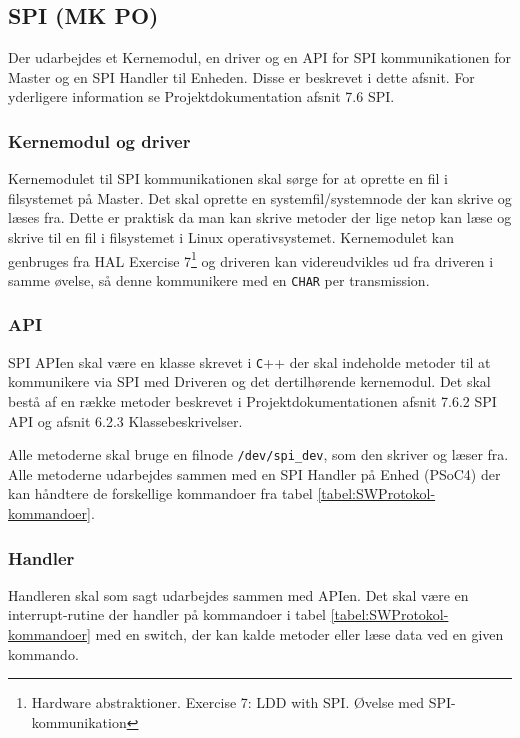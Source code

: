 \subsection{SPI (MK PO)}

Der udarbejdes et Kernemodul, en driver og en API for SPI kommunikationen for Master og en SPI Handler til Enheden. Disse er beskrevet i dette afsnit. For yderligere information se Projektdokumentation afsnit 7.6 SPI.

\subsubsection*{Kernemodul og driver}

Kernemodulet til SPI kommunikationen skal sørge for at oprette en fil i filsystemet på Master. Det skal oprette en systemfil/systemnode der kan skrive og læses fra. Dette er praktisk da man kan skrive metoder der lige netop kan læse og skrive til en fil i filsystemet i Linux operativsystemet. Kernemodulet kan genbruges fra HAL Exercise 7\footnote{Hardware abstraktioner. Exercise 7: LDD with SPI. Øvelse med SPI-kommunikation} og driveren kan videreudvikles ud fra driveren i samme øvelse, så denne kommunikere med en \verb+CHAR+ per transmission.

\subsubsection*{API}

SPI APIen skal være en klasse skrevet i \verb+C+++ der skal indeholde metoder til at kommunikere via SPI med Driveren og det dertilhørende kernemodul. Det skal bestå af en række metoder beskrevet i Projektdokumentationen afsnit 7.6.2 SPI API og afsnit 6.2.3 Klassebeskrivelser. 

Alle metoderne skal bruge en filnode \verb+/dev/spi_dev+, som den skriver og læser fra. Alle metoderne udarbejdes sammen med en SPI Handler på Enhed (PSoC4) der kan håndtere de forskellige kommandoer fra tabel \ref{tabel:SWProtokol-kommandoer}.

\subsubsection*{Handler}

Handleren skal som sagt udarbejdes sammen med APIen. Det skal være en interrupt-rutine der handler på kommandoer i tabel \ref{tabel:SWProtokol-kommandoer} med en switch, der kan kalde metoder eller læse data ved en given kommando.